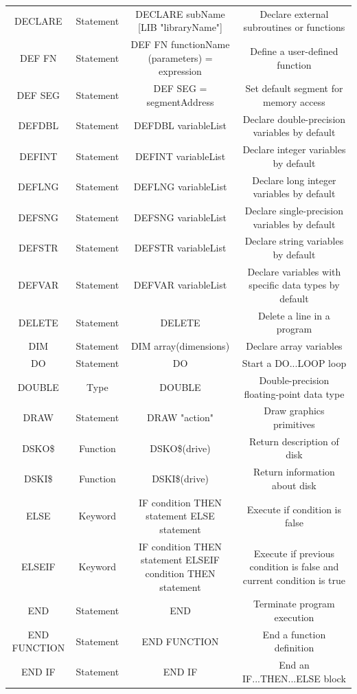 \documentclass[10pt, reqno]{exam}
\begin{document}
{\begin{longtable}{|c|c|c|c|}
    DECLARE & Statement & DECLARE subName [LIB "libraryName"] & Declare external subroutines or functions \\
    DEF FN & Statement & DEF FN functionName (parameters) = expression & Define a user-defined function \\
    DEF SEG & Statement & DEF SEG = segmentAddress & Set default segment for memory access \\
    DEFDBL & Statement & DEFDBL variableList & Declare double-precision variables by default \\
    DEFINT & Statement & DEFINT variableList & Declare integer variables by default \\
    DEFLNG & Statement & DEFLNG variableList & Declare long integer variables by default \\
    DEFSNG & Statement & DEFSNG variableList & Declare single-precision variables by default \\
    DEFSTR & Statement & DEFSTR variableList & Declare string variables by default \\
    DEFVAR & Statement & DEFVAR variableList & Declare variables with specific data types by default \\
    DELETE & Statement & DELETE & Delete a line in a program \\
    DIM & Statement & DIM array(dimensions) & Declare array variables \\
    DO & Statement & DO & Start a DO...LOOP loop \\
    DOUBLE & Type & DOUBLE & Double-precision floating-point data type \\
    DRAW & Statement & DRAW "action" & Draw graphics primitives \\
    DSKO\$ & Function & DSKO\$(drive) & Return description of disk \\
    DSKI\$ & Function & DSKI\$(drive) & Return information about disk \\
    ELSE & Keyword & IF condition THEN statement ELSE statement & Execute if condition is false \\
    ELSEIF & Keyword & IF condition THEN statement ELSEIF condition THEN statement & Execute if previous condition is false and current condition is true \\
    END & Statement & END & Terminate program execution \\
    END FUNCTION & Statement & END FUNCTION & End a function definition \\
    END IF & Statement & END IF & End an IF...THEN...ELSE block \\

\end{longtable}}
\end{document}
